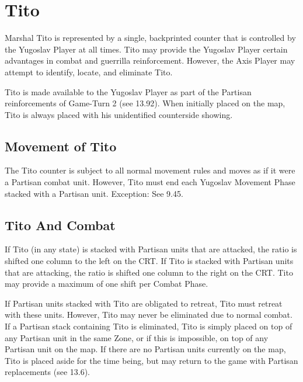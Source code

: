 \section{Tito}\label{sec:9.0}


\begin{generalrule}
Marshal Tito is represented by a single, backprinted counter that is controlled by the Yugoslav Player at all times. Tito may provide the Yugoslav Player certain advantages in combat and guerrilla reinforcement. However, the Axis Player may attempt to identify, locate, and eliminate Tito.
\end{generalrule}


\begin{procedure}
Tito is made available to the Yugoslav Player as part of the Partisan reinforcements of Game-Turn 2 (see 13.92). When initially placed on the map, Tito is always placed with his unidentified counterside showing.
\end{procedure}

\subsection{Movement of Tito}\label{sec:9.1}

The Tito counter is subject to all normal movement rules and moves as if it
were a Partisan combat unit. However, Tito must end each Yugoslav Movement
Phase stacked with a Partisan unit. Exception: See 9.45.

\subsection{Tito And Combat}\label{sec:9.2}

 If Tito (in any state) is stacked with Partisan units that are attacked, the ratio is shifted one column to the left on the CRT. If Tito is stacked with Partisan units that are attacking, the ratio is shifted one column to the right on the CRT. Tito may provide a maximum of one shift per Combat Phase.

 If Partisan units stacked with Tito are obligated to retreat, Tito must retreat with these units. However, Tito may never be eliminated due to normal combat. If a Partisan stack containing Tito is eliminated, Tito is simply placed on top of any Partisan unit in the same Zone, or if this is impossible, on top of any Partisan unit on the map. If there are no Partisan units currently on the map, Tito is placed aside for the time being, but may return to the game with Partisan replacements (see 13.6).


